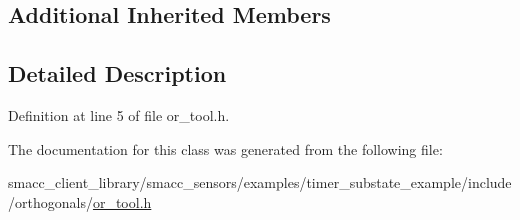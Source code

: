 \subsection*{Additional Inherited Members}


\subsection{Detailed Description}


Definition at line 5 of file or\+\_\+tool.\+h.



The documentation for this class was generated from the following file\+:\begin{DoxyCompactItemize}
\item 
smacc\+\_\+client\+\_\+library/smacc\+\_\+sensors/examples/timer\+\_\+substate\+\_\+example/include/orthogonals/\hyperlink{smacc__client__library_2smacc__sensors_2examples_2timer__substate__example_2include_2orthogonals_2or__tool_8h}{or\+\_\+tool.\+h}\end{DoxyCompactItemize}
